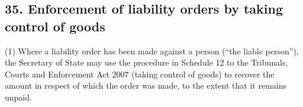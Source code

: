\documentclass[12pt,a4paper]{article}
\begin{document}


\subsection{35. Enforcement of liability orders by 
taking control of goods  %
}

(1) Where a liability order has been made against a person (“the liable person”), the 
Secretary of State  %
may 
use the procedure in Schedule 12 to the Tribunals, Courts and Enforcement Act 2007 (taking control of goods) to recover the amount in respect of which the order was made, to the extent that it remains unpaid.  %
\end{document}
